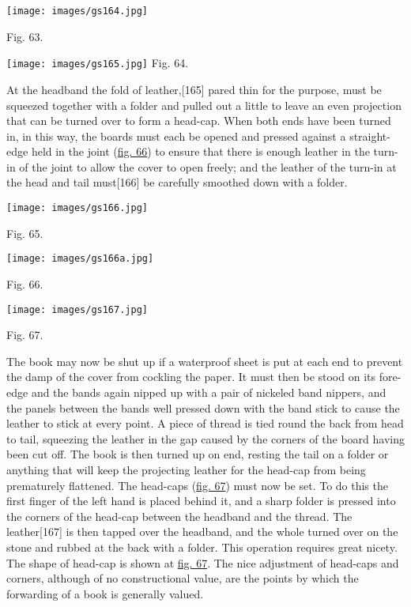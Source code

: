 \documentclass[
]{article}
\begin{document}
\protect\hypertarget{Fig_63}{}{}
\texttt{[image: images/gs164.jpg]}

Fig. 63.

\protect\hypertarget{Fig_64}{}{}
\texttt{[image: images/gs165.jpg]}
{Fig. 64.}

At the headband the fold of
leather,{\protect\hypertarget{Page_165}{}{{[}165{]}}} pared thin for the
purpose, must be squeezed together with a folder and pulled out a little
to leave an even projection that can be turned over to form a head-cap.
When both ends have been turned in, in this way, the boards must each be
opened and pressed against a straight-edge held in the joint
(\protect\hyperlink{Fig_66}{fig. 66}) to ensure that there is enough
leather in the turn-in of the joint to allow the cover to open freely;
and the leather of the turn-in at the head and tail
must{\protect\hypertarget{Page_166}{}{{[}166{]}}} be carefully smoothed
down with a folder.

\protect\hypertarget{Fig_65}{}{}
\texttt{[image: images/gs166.jpg]}

Fig. 65.

\protect\hypertarget{Fig_66}{}{}
\texttt{[image: images/gs166a.jpg]}

Fig. 66.

\protect\hypertarget{Fig_67}{}{}
\texttt{[image: images/gs167.jpg]}

Fig. 67.

The book may now be shut up if a waterproof sheet is put at each end to
prevent the damp of the cover from cockling the paper. It must then be
stood on its fore-edge and the bands again nipped up with a pair of
nickeled band nippers, and the panels between the bands well pressed
down with the band stick to cause the leather to stick at every point. A
piece of thread is tied round the back from head to tail, squeezing the
leather in the gap caused by the corners of the board having been cut
off. The book is then turned up on end, resting the tail on a folder or
anything that will keep the projecting leather for the head-cap from
being prematurely flattened. The head-caps
(\protect\hyperlink{Fig_67}{fig. 67}) must now be set. To do this the
first finger of the left hand is placed behind it, and a sharp folder is
pressed into the corners of the head-cap between the headband and the
thread. The leather{\protect\hypertarget{Page_167}{}{{[}167{]}}} is then
tapped over the headband, and the whole turned over on the stone and
rubbed at the back with a folder. This operation requires great nicety.
The shape of head-cap is shown at \protect\hyperlink{Fig_67}{fig. 67}.
The nice adjustment of head-caps and corners, although of no
constructional value, are the points by which the forwarding of a book
is generally valued.
\end{document}
